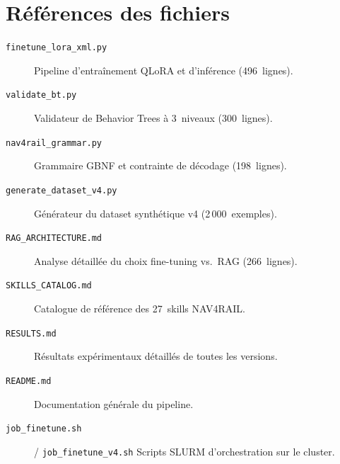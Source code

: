 \documentclass[a4paper,11pt]{article}
\newcommand{\file}[1]{\texttt{#1}}
\begin{document}
\section*{Références des fichiers}

\begin{description}
    \item[\file{finetune\_lora\_xml.py}] Pipeline d'entraînement QLoRA et
    d'inférence (496~lignes).
    \item[\file{validate\_bt.py}] Validateur de Behavior Trees à 3~niveaux
    (300~lignes).
    \item[\file{nav4rail\_grammar.py}] Grammaire GBNF et contrainte de
    décodage (198~lignes).
    \item[\file{generate\_dataset\_v4.py}] Générateur du dataset synthétique
    v4 (2\,000~exemples).
    \item[\file{RAG\_ARCHITECTURE.md}] Analyse détaillée du choix
    fine-tuning vs.\ RAG (266~lignes).
    \item[\file{SKILLS\_CATALOG.md}] Catalogue de référence des 27~skills
    NAV4RAIL.
    \item[\file{RESULTS.md}] Résultats expérimentaux détaillés de toutes
    les versions.
    \item[\file{README.md}] Documentation générale du pipeline.
    \item[\file{job\_finetune.sh}] / \file{job\_finetune\_v4.sh} Scripts
    SLURM d'orchestration sur le cluster.
\end{description}
\end{document}
